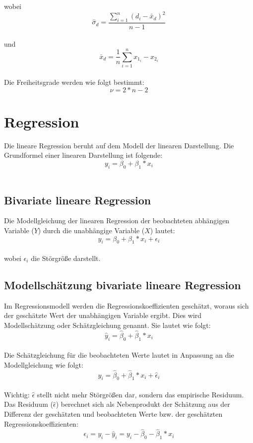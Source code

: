 \documentclass[11pt,a4paper]{article}
\begin{document}
wobei $$\hat{\sigma}_d = \frac{\sum_{i=1}^n (d_i - \bar{x}_d)^2}{n-1}$$ \\

und $$\bar{x}_d = \frac{1}{n}\sum_{i=1}^n {x_{1_i} - x_{2_i}}$$\\

Die Freiheitsgrade werden wie folgt bestimmt:\\
$$\nu = 2 * n - 2$$

\section{Regression}
Die lineare Regression beruht auf dem Modell der linearen Darstellung. Die Grundformel einer linearen Darstellung ist folgende:\\
$$y_i = \beta_0 + \beta_1 \ast x_i$$\\

\subsection{Bivariate lineare Regression}
Die Modellgleichung der linearen Regression der beobachteten abhängigen Variable ($Y$) durch die unabhängige Variable ($X$) lautet:\\
$$y_i = \beta_0 + \beta_1 \ast x_i + \epsilon_i$$\\

wobei $\epsilon_i$ die Störgröße darstellt. 

\subsection{Modellschätzung bivariate lineare Regression}
Im Regressionsmodell werden die Regressionskoeffizienten geschätzt, woraus sich der geschätzte Wert der unabhängigen Variable ergibt. Dies wird Modellschätzung oder Schätzgleichung genannt. Sie lautet wie folgt:\\
$$\hat{y}_i = \hat{\beta}_0 + \hat{\beta}_1 \ast x_i$$ \\

Die Schätzgleichung für die beobachteten Werte lautet in Anpassung an die Modellgleichung wie folgt: \\
$$y_i = \hat{\beta}_0 + \hat{\beta}_1 \ast x_i + \hat{\epsilon}_i$$ \\

Wichtig: $\hat{\epsilon}$ stellt nicht mehr Störgrößen dar, sondern das empirische Residuum. Das Residuum ($\hat{\epsilon}$) berechnet sich als Nebenprodukt der Schätzung aus der Differenz der geschätzten und beobachteten Werte bzw. der geschätzten Regressionskoeffizienten:\\
$$ \epsilon_i = y_i - \hat{y}_i = y_i - \hat{\beta}_0 - \hat{\beta}_1*x_i$$
\end{document}
